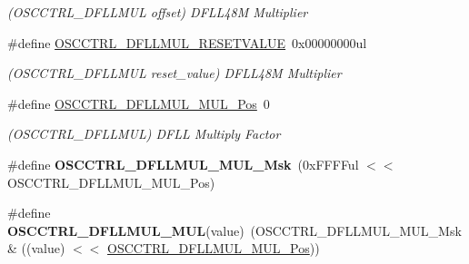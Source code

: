 \begin{DoxyCompactItemize}
\begin{DoxyCompactList}\small\item\em (O\+S\+C\+C\+T\+R\+L\+\_\+\+D\+F\+L\+L\+M\+U\+L offset) D\+F\+L\+L48\+M Multiplier \end{DoxyCompactList}\item 
\hypertarget{group___s_a_m_l21___o_s_c_c_t_r_l_ga16ffd9100a1b1e248997caaf180cc818}{}\#define \hyperlink{group___s_a_m_l21___o_s_c_c_t_r_l_ga16ffd9100a1b1e248997caaf180cc818}{O\+S\+C\+C\+T\+R\+L\+\_\+\+D\+F\+L\+L\+M\+U\+L\+\_\+\+R\+E\+S\+E\+T\+V\+A\+L\+U\+E}~0x00000000ul\label{group___s_a_m_l21___o_s_c_c_t_r_l_ga16ffd9100a1b1e248997caaf180cc818}

\begin{DoxyCompactList}\small\item\em (O\+S\+C\+C\+T\+R\+L\+\_\+\+D\+F\+L\+L\+M\+U\+L reset\+\_\+value) D\+F\+L\+L48\+M Multiplier \end{DoxyCompactList}\item 
\hypertarget{group___s_a_m_l21___o_s_c_c_t_r_l_gaf28d647c2e21f62492d2fb7dae6379c1}{}\#define \hyperlink{group___s_a_m_l21___o_s_c_c_t_r_l_gaf28d647c2e21f62492d2fb7dae6379c1}{O\+S\+C\+C\+T\+R\+L\+\_\+\+D\+F\+L\+L\+M\+U\+L\+\_\+\+M\+U\+L\+\_\+\+Pos}~0\label{group___s_a_m_l21___o_s_c_c_t_r_l_gaf28d647c2e21f62492d2fb7dae6379c1}

\begin{DoxyCompactList}\small\item\em (O\+S\+C\+C\+T\+R\+L\+\_\+\+D\+F\+L\+L\+M\+U\+L) D\+F\+L\+L Multiply Factor \end{DoxyCompactList}\item 
\hypertarget{group___s_a_m_l21___o_s_c_c_t_r_l_ga1cd6bcfb36ed448cfe85f2e679db7428}{}\#define {\bfseries O\+S\+C\+C\+T\+R\+L\+\_\+\+D\+F\+L\+L\+M\+U\+L\+\_\+\+M\+U\+L\+\_\+\+Msk}~(0x\+F\+F\+F\+Ful $<$$<$ O\+S\+C\+C\+T\+R\+L\+\_\+\+D\+F\+L\+L\+M\+U\+L\+\_\+\+M\+U\+L\+\_\+\+Pos)\label{group___s_a_m_l21___o_s_c_c_t_r_l_ga1cd6bcfb36ed448cfe85f2e679db7428}

\item 
\hypertarget{group___s_a_m_l21___o_s_c_c_t_r_l_gaa510a3702b703e023e471e21b588f9af}{}\#define {\bfseries O\+S\+C\+C\+T\+R\+L\+\_\+\+D\+F\+L\+L\+M\+U\+L\+\_\+\+M\+U\+L}(value)~(O\+S\+C\+C\+T\+R\+L\+\_\+\+D\+F\+L\+L\+M\+U\+L\+\_\+\+M\+U\+L\+\_\+\+Msk \& ((value) $<$$<$ \hyperlink{group___s_a_m_l21___o_s_c_c_t_r_l_gaf28d647c2e21f62492d2fb7dae6379c1}{O\+S\+C\+C\+T\+R\+L\+\_\+\+D\+F\+L\+L\+M\+U\+L\+\_\+\+M\+U\+L\+\_\+\+Pos}))\label{group___s_a_m_l21___o_s_c_c_t_r_l_gaa510a3702b703e023e471e21b588f9af}


\end{DoxyCompactItemize}
